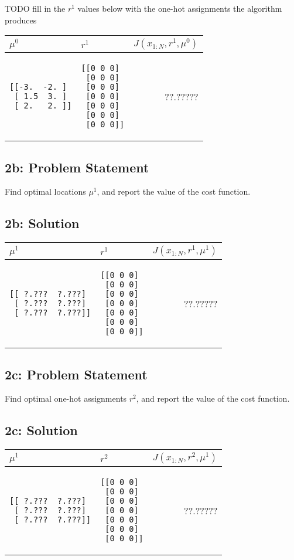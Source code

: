 \documentclass[10pt]{article}
\newcommand{\officialdirections}[1]{{\color{blue} #1}}
\begin{document}
TODO fill in the $r^1$ values below with the one-hot assignments the algorithm produces

\begin{tabular}{p{5cm} | p{5cm} | r}
$\mu^0$ & $r^1$ & $J(x_{1:N}, r^1, \mu^0)$
\\
\midrule
\begin{verbatim}
[[-3.  -2. ]
 [ 1.5  3. ]
 [ 2.   2. ]]
\end{verbatim}
&	
\begin{verbatim}
[[0 0 0]
 [0 0 0]
 [0 0 0]
 [0 0 0]
 [0 0 0]
 [0 0 0]
 [0 0 0]]
\end{verbatim}
&
 ??.?????
\end{tabular}

\officialdirections{
\subsection*{2b: Problem Statement}
Find optimal locations $\mu^1$, and report the value of the cost function.
}
\subsection{2b: Solution}

\begin{tabular}{p{5cm} | p{5cm} | r}
$\mu^1$ & $r^1$ & $J(x_{1:N}, r^1, \mu^1)$
\\
\midrule
\begin{verbatim}
[[ ?.???  ?.???]
 [ ?.???  ?.???]
 [ ?.???  ?.???]]
\end{verbatim}
&	
\begin{verbatim}
[[0 0 0]
 [0 0 0]
 [0 0 0]
 [0 0 0]
 [0 0 0]
 [0 0 0]
 [0 0 0]]
\end{verbatim}
&
 ??.?????
\end{tabular}

\newpage
\officialdirections{
\subsection*{2c: Problem Statement}
Find optimal one-hot assignments $r^2$, and report the value of the cost function.
}
\subsection{2c: Solution}

\begin{tabular}{p{5cm} | p{5cm} | r}
$\mu^1$ & $r^2$ & $J(x_{1:N}, r^2, \mu^1)$
\\
\midrule
\begin{verbatim}
[[ ?.???  ?.???]
 [ ?.???  ?.???]
 [ ?.???  ?.???]]
\end{verbatim}
&	
\begin{verbatim}
[[0 0 0]
 [0 0 0]
 [0 0 0]
 [0 0 0]
 [0 0 0]
 [0 0 0]
 [0 0 0]]
\end{verbatim}
&
 ??.?????
\end{tabular}
\end{document}
